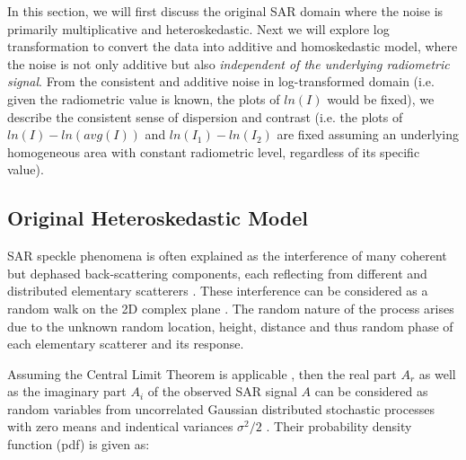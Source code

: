 \documentclass[journal]{IEEEtran}
\begin{document}


In this section, we will first discuss the original SAR domain where the noise is primarily multiplicative and heteroskedastic.
Next we will explore log transformation to convert the data into additive and homoskedastic model, where the noise is not only additive but also \textit{independent of the underlying radiometric signal}.
From the consistent and additive noise in log-transformed domain (i.e. given the radiometric value is known, the plots of $ln(I)$ would be fixed), we describe the consistent sense of dispersion and contrast (i.e. the plots of $ln(I)-ln(avg(I))$ and $ln(I_1)-ln(I_2)$ are fixed assuming an underlying homogeneous area with constant radiometric level, regardless of its specific value).

\subsection{Original Heteroskedastic Model}

SAR speckle phenomena is often explained as the interference of many coherent but dephased back-scattering components, each reflecting from different and distributed elementary scatterers \cite{Oliver_ProcIEEE_1963, Leith_ProcIEEE_1971}. These interference can be considered as a random walk on the 2D complex plane \cite{Goodman_JOptSocAm_76}.  The random nature of the process arises due to the unknown random location, height, distance and thus random phase of each elementary scatterer and its response.

Assuming the Central Limit Theorem is applicable \cite{Goodman_Springer_1975}, then the real part $A_r$ as well as the imaginary part $A_i$ of the observed SAR signal $A$ can be considered as random variables from uncorrelated Gaussian distributed stochastic processes with zero means and indentical variances $\sigma^2/2$  \cite{Lee_CRCPress_2009}. Their probability density function (pdf) is given as:
\end{document}
